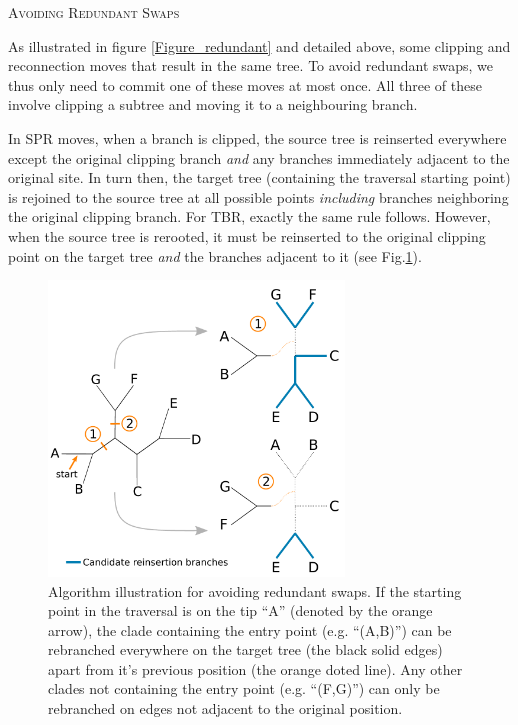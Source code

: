 \documentclass[12pt,letterpaper]{article}
\renewcommand{\section}[1]{%
\bigskip
\begin{center}
\begin{Large}
\normalfont\scshape #1
\medskip
\end{Large}
\end{center}}
\begin{document}
\section{Avoiding Redundant Swaps}
As illustrated in figure \ref{Figure_redundant} and detailed above, some clipping and reconnection moves that result in the same tree.
To avoid redundant swaps, we thus only need to commit one of these moves at most once.
All three of these involve clipping a subtree and moving it to a neighbouring branch. 

In SPR moves, when a branch is clipped, the source tree is reinserted everywhere except the original clipping branch \textit{and} any branches immediately adjacent to the original site. 
In turn then, the target tree (containing the traversal starting point) is rejoined to the source tree at all possible points \textit{including} branches neighboring the original clipping branch.
For TBR, exactly the same rule follows. 
However, when the source tree is rerooted, it must be reinserted to the original clipping point on the target tree \textit{and} the branches adjacent to it (see Fig.\ref{Figure_Neighbor}).

\begin{figure}[!htbp]
\centering
   \includegraphics[width=0.7\textwidth]{Figure/Figure_Neighbour.pdf}
\caption{Algorithm illustration for avoiding redundant swaps. If the starting point in the traversal is on the tip ``A'' (denoted by the orange arrow), the clade containing the entry point (e.g. ``(A,B)'') can be rebranched everywhere on the target tree (the black solid edges) apart from it's previous position (the orange doted line). Any other clades not containing the entry point (e.g. ``(F,G)'') can only be rebranched on edges not adjacent to the original position.}
\label{Figure_Neighbor}
\end{figure}
\end{document}

